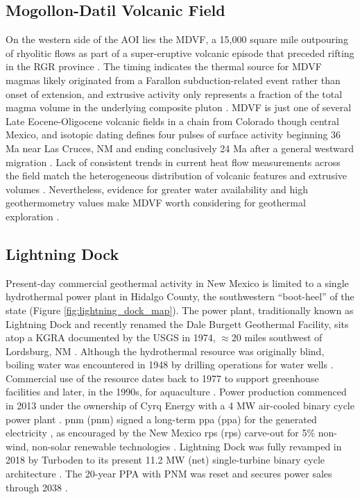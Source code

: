 \subsection{Mogollon-Datil Volcanic Field}\label{ch2:mdvf_province}
On the western side of the AOI lies the MDVF, a 15,000 square mile outpouring of rhyolitic flows as part of a super-eruptive volcanic episode that preceded rifting in the RGR province \citep{keller_rio_1999}. The timing indicates the thermal source for MDVF magmas likely originated from a Farallon subduction-related event rather than onset of extension, and extrusive activity only represents a fraction of the total magma volume in the underlying composite pluton \citep{olsen_rio_1987,schneider_crustal_1994}. MDVF is just one of several Late Eocene-Oligocene volcanic fields in a chain from Colorado though central Mexico, and isotopic dating defines four pulses of surface activity beginning 36 Ma near Las Cruces, NM and ending conclusively 24 Ma after a general westward migration \citep{mcintosh_time-stratigraphic_1992}. Lack of consistent trends in current heat flow measurements across the field match the heterogeneous distribution of volcanic features and extrusive volumes \citep{mcintosh_time-stratigraphic_1992}. Nevertheless, evidence for greater water availability and high geothermometry values make MDVF worth considering for geothermal exploration \citep{pepin_new_2019}.

\subsection{Lightning Dock}\label{ch2:lightning_dock}
Present-day commercial geothermal activity in New Mexico is limited to a single hydrothermal power plant in Hidalgo County, the southwestern ``boot-heel'' of the state (Figure \ref{fig:lightning_dock_map}). The power plant, traditionally known as Lightning Dock and recently renamed the Dale Burgett Geothermal Facility, sits atop a KGRA documented by the USGS in 1974, $\approx20$ miles southwest of Lordsburg, NM \citep{dahal_evaluation_2012}. Although the hydrothermal resource was originally blind, boiling water was encountered in 1948 by drilling operations for water wells \citep{elston_geology_1983}. Commercial use of the resource dates back to 1977 to support greenhouse facilities and later, in the 1990s, for aquaculture \citep{crowell_history_2014}. Power production commenced in 2013 under the ownership of Cyrq Energy with a 4 MW air-cooled binary cycle power plant \citep{goodman_lightning_2013}. \acrlong{pnm} (\acrshort{pnm}) signed a long-term \acrlong{ppa} (\acrshort{ppa}) for the generated electricity \citep{dahal_evaluation_2012}, as encouraged by the New Mexico \acrlong{rps} (\acrshort{rps}) carve-out for 5\% non-wind, non-solar renewable technologies \citep{dsire_dsire_2021}. Lightning Dock was fully revamped in 2018 by Turboden to its present 11.2 MW (net) single-turbine binary cycle architecture \citep{bonafin_repowering_2019}. The 20-year PPA with PNM was reset and secures power sales through 2038 \citep{oconnell_matter_2018}.

